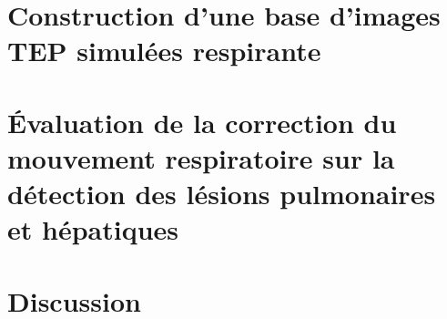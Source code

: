 \documentclass[12pt, twoside, a4paper]{book}
\begin{document}
	
	

\part{Construction d'une base d'images TEP simulées respirante}
	
	

\part{\'Evaluation de la correction du mouvement respiratoire sur la détection des lésions pulmonaires et hépatiques}
	

\part{Discussion}
	


\newpage
{}





\newpage



\newpage

\newpage

\end{document}
